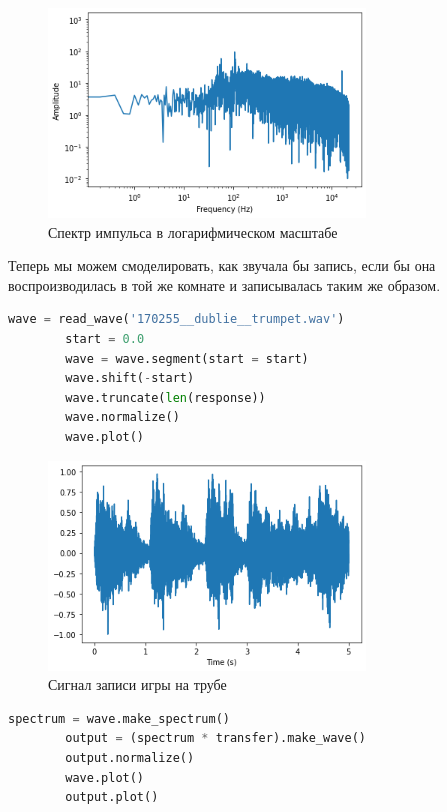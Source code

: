 \documentclass[a4paper, 12pt]{report}
\begin{document}
	\begin{figure}[H]
		\centering
		\includegraphics[width=0.75\textwidth]{task11.png}
		\caption{Спектр импульса в логарифмическом масштабе}
		\label{fig:task11}
	\end{figure}
	Теперь мы можем смоделировать, как звучала бы запись, если бы она воспроизводилась в той же комнате и записывалась таким же образом.
	\begin{lstlisting}[language=Python,caption=Запись игры на трубе]
		wave = read_wave('170255__dublie__trumpet.wav')
		start = 0.0
		wave = wave.segment(start = start)
		wave.shift(-start)
		wave.truncate(len(response))
		wave.normalize()
		wave.plot()
	\end{lstlisting}
	\begin{figure}[H]
		\centering
		\includegraphics[width=0.75\textwidth]{task12.png}
		\caption{Сигнал записи игры на трубе}
		\label{fig:task12}
	\end{figure}
	\begin{lstlisting}[language=Python,caption=Перемножаем спектры для этого сигнала]
		spectrum = wave.make_spectrum()
		output = (spectrum * transfer).make_wave()
		output.normalize()
		wave.plot()
		output.plot()
	\end{lstlisting}
\end{document}
